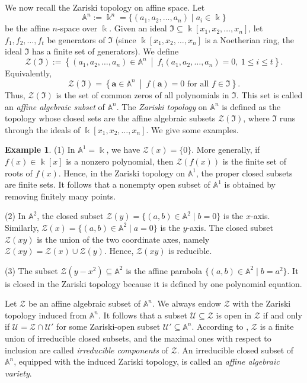 \documentclass[a4,12pt]{amsart}
\numberwithin{equation}{section} %
\theoremstyle{definition} %
\newtheorem{example}[theorem]{Example} %
\begin{document}
We now recall the Zariski topology on affine space. Let 
\[
\mathbb{A}^n:=\Bbbk^n=\{(a_1,a_2,\ldots,a_n)\mid a_i\in\Bbbk\}
\]
be the affine $n$-space over $\Bbbk$. Given an ideal $\mathfrak{I}\subseteq \Bbbk[x_1,x_2,\ldots,x_n]$, let $f_1,f_2,\ldots,f_t$ be generators of $\mathfrak{I}$ (since $\Bbbk[x_1,x_2,\ldots,x_n]$ is a Noetherian ring, the ideal $\mathfrak{I}$ has a finite set of generators). We define
\[
\mathcal{Z}(\mathfrak{I}) := \left\{
(a_1,a_2,\ldots,a_n)\in\mathbb{A}^n
\ \middle|\
f_i(a_1,a_2,\ldots,a_n)=0,\ 1\leq i\leq t
\right\}.
\]
Equivalently,
\[
\mathcal{Z}(\mathfrak{I}) = \left\{
\mathbf{a}\in\mathbb{A}^n
\ \middle|\
f(\mathbf{a})=0 \text{ for all } f\in \mathfrak{I}
\right\}.
\]
Thus, $\mathcal{Z}(\mathfrak{I})$ is the set of common zeros of all polynomials in $\mathfrak{I}$. This set is called an \emph{affine algebraic subset} of $\mathbb{A}^n$. The \emph{Zariski topology} on $\mathbb{A}^n$ is defined as the topology whose closed sets are the affine algebraic subsets $\mathcal{Z}(\mathfrak{I})$, where $\mathfrak{I}$ runs through the ideals of $\Bbbk[x_1,x_2,\ldots,x_n]$. We give some examples. 

\begin{example}
(1) In $\mathbb{A}^1=\Bbbk$, we have $\mathcal{Z}(x)=\{0\}$. More generally, if $f(x)\in\Bbbk[x]$ is a nonzero polynomial, then $\mathcal{Z}(f(x))$ is the finite set of roots of $f(x)$. Hence, in the Zariski topology on $\mathbb{A}^1$, the proper closed subsets are finite sets. It follows that a nonempty open subset of $\mathbb{A}^1$ is obtained by removing finitely many points. 

(2) In $\mathbb{A}^2$, the closed subset $\mathcal{Z}(y) = \{(a,b)\in\mathbb{A}^2\mid b=0\}$ is the $x$-axis. Similarly, $\mathcal{Z}(x) = \{(a,b)\in\mathbb{A}^2\mid a=0\}$ is the $y$-axis. The closed subset $\mathcal{Z}(xy)$ is the union of the two coordinate axes, namely $\mathcal{Z}(xy)=\mathcal{Z}(x)\cup \mathcal{Z}(y)$. Hence, $\mathcal{Z}(xy)$ is reducible. 

(3) The subset $\mathcal{Z}(y-x^2)\subseteq \mathbb{A}^2$ is the affine parabola $\{(a,b)\in\mathbb{A}^2\mid b=a^2\}$. It is closed in the Zariski topology because it is defined by one polynomial equation.
\end{example}

Let $\mathcal{Z}$ be an affine algebraic subset of $\mathbb{A}^n$. We always endow $\mathcal{Z}$ with the Zariski topology induced from $\mathbb{A}^n$. It follows that a subset $\mathcal{U}\subseteq \mathcal{Z}$ is open in $\mathcal{Z}$ if and only if $\mathcal{U}= \mathcal{Z}\cap \mathcal{U}'$ for some Zariski-open subset $\mathcal{U}'\subseteq\mathbb{A}^n$. According to \cite[Chapter I, Proposition 1.5]{Hartshorne-book-1977}, $\mathcal{Z}$ is a finite union of irreducible closed subsets, and the maximal ones with respect to inclusion are called \emph{irreducible components} of $\mathcal{Z}$. An irreducible closed subset of $\mathbb{A}^n$, equipped with the induced Zariski topology, is called an \emph{affine algebraic variety}. 
\end{document}
